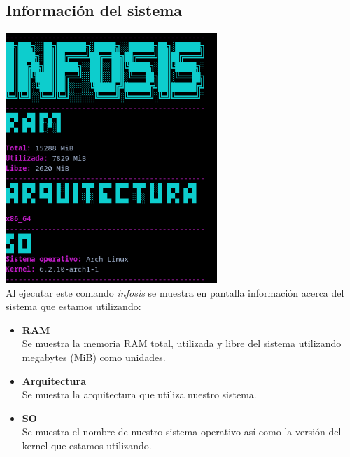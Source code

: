 \documentclass[12pt,a4paper]{article}
\begin{document}
\subsection{Información del sistema}
    \centering
    \includegraphics[width=8cm]{img/infosis.png}
    \\
    \justifying
    \noindent
    Al ejecutar este comando \textit{infosis} se muestra en pantalla información acerca del sistema que estamos utilizando:
    \begin{itemize}
        \item \textbf{RAM} \\
        Se muestra la memoria RAM total, utilizada y libre del sistema utilizando megabytes (MiB) como unidades.
        \item \textbf{Arquitectura} \\
        Se muestra la arquitectura que utiliza nuestro sistema.
        \item \textbf{SO} \\
        Se muestra el nombre de nuestro sistema operativo así como la versión del kernel que estamos utilizando.
    \end{itemize}
    
\end{document}
